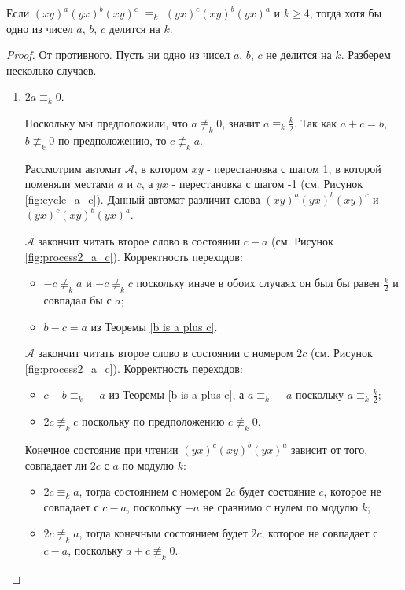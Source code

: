	\begin{lemma}\label{abc div k}
		Если $(xy)^a(yx)^b(xy)^c$ $\equiv_k$ $(yx)^c(xy)^b(yx)^a$ и $k \ge 4$, тогда хотя бы одно из чисел $a$, $b$, $c$ делится на $k$.
	\end{lemma}
	\begin{proof}
		От противного. Пусть ни одно из чисел $a$, $b$, $c$ не делится на $k$. Разберем несколько случаев.
		\begin{enumerate}
			\item $2a \equiv_k 0$.
			
			Поскольку мы предположили, что $a \not \equiv_k 0$, значит $a \equiv_k \frac{k}{2}$. Так как $a+c=b$, $b \not \equiv_k 0$ по предположению, то $c \not \equiv_k a$.
			
			
			Рассмотрим автомат $\mathscr{A}$, в котором $xy$ - перестановка с шагом 1, в которой поменяли местами $a$ и $c$, а $yx$ - перестановка с шагом -1 (см. Рисунок \ref{fig:cycle_a_c}). Данный автомат различит слова $(xy)^a(yx)^b(xy)^c$ и $(yx)^c(xy)^b(yx)^a$. 
			
			$\mathscr{A}$ закончит читать второе слово в состоянии $c-a$ (см. Рисунок \ref{fig:process2_a_c}).
			Корректность переходов:
			\begin{itemize}
				\item $-c \not \equiv_k a$ и $-c \not \equiv_k c$ поскольку иначе в обоих случаях он был бы равен $\frac{k}{2}$ и совпадал бы с $a$;
				\item $b-c = a$ из Теоремы \ref{b is a plus c}.
			\end{itemize}
			
			$\mathscr{A}$ закончит читать второе слово в состоянии с номером $2c$ (см. Рисунок \ref{fig:process2_a_c}).
			Корректность переходов:
			\begin{itemize}
				\item $c-b \equiv_k -a$ из Теоремы \ref{b is a plus c}, а $a \equiv_k -a$ поскольку $a \equiv_k \frac{k}{2}$;
				\item $2c \not \equiv_k c$ поскольку по предположению $c \not \equiv_k 0$.
			\end{itemize}
			Конечное состояние при чтении $(yx)^c(xy)^b(yx)^a$ зависит от того, совпадает ли $2c$ с $a$ по модулю $k$:
			\begin{itemize}
				\item $2c \equiv_k a$, тогда состоянием с номером $2c$ будет состояние $c$, которое не совпадает с $c-a$, поскольку $-a$ не сравнимо с нулем по модулю $k$;
				\item $2c \not \equiv_k a$, тогда конечным состоянием будет $2c$, которое не совпадает с $c-a$, поскольку $a+c \not \equiv_k 0$.
			\end{itemize}
			

\end{enumerate}
\end{proof}
